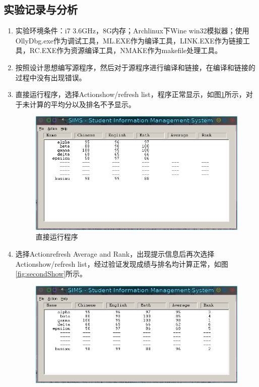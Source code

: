\documentclass{article}
\begin{document}
	\subsection{实验记录与分析}
	\begin{enumerate}
		\item 实验环境条件：i7 3.6GHz，8G内存；Archlinux下Wine win32模拟器；使用OllyDbg.exe作为调试工具，ML.EXE作为编译工具，LINK.EXE作为链接工具，RC.EXE作为资源编译工具，NMAKE作为makefile处理工具。
		\item 按照设计思想编写源程序，然后对于源程序进行编译和链接，在编译和链接的过程中没有出现错误。
		\item 直接运行程序，选择Action\textrightarrow show/refresh list，程序正常显示，如图\ref{fig:firstShow}所示，对于未计算的平均分以及排名不予显示。
			\begin{figure}[H]
				\centering
				\includegraphics[width=0.85\linewidth]{res/homework_5/firstShow.png}
				\caption{直接运行程序}
				\label{fig:firstShow}
			\end{figure}
		\item 选择Action\textrightarrow refresh Average and Rank，出现提示信息后再次选择Action\textrightarrow show/refresh list，经过验证发现成绩与排名均计算正常，如图\ref{fig:secondShow}所示。
			\begin{figure}[H]
				\centering
				\includegraphics[width=0.85\linewidth]{res/homework_5/secondShow.png}

\end{figure}
\end{enumerate}
\end{document}
